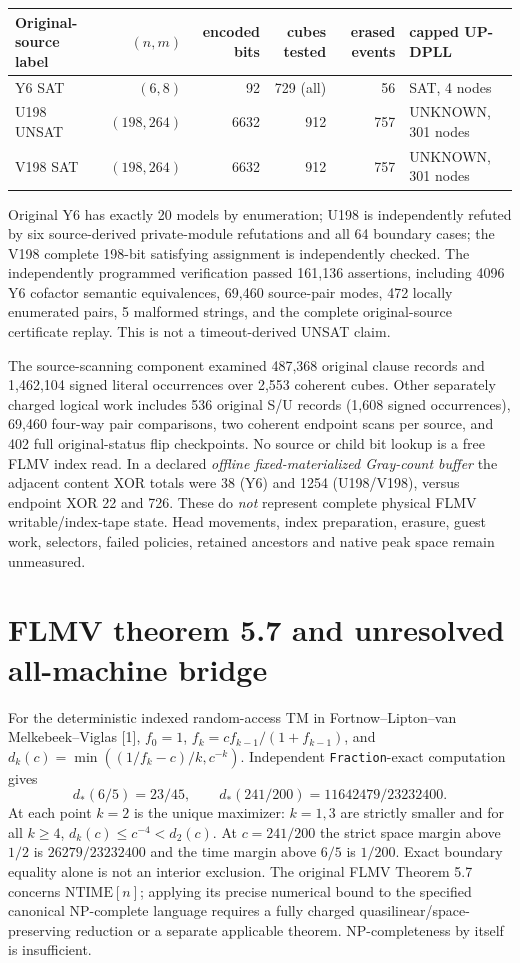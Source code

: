 \documentclass[10pt]{article}
\begin{document}
\begin{center}
\begin{tabular}{lrrrrl}
\toprule
Original-source label & $(n,m)$ & encoded bits & cubes tested & erased events & capped UP-DPLL \\
\midrule
Y6 SAT & $(6,8)$ & 92 & 729 (all) & 56 & SAT, 4 nodes\\
U198 UNSAT & $(198,264)$ & 6632 & 912 & 757 & UNKNOWN, 301 nodes\\
V198 SAT & $(198,264)$ & 6632 & 912 & 757 & UNKNOWN, 301 nodes\\
\bottomrule
\end{tabular}
\end{center}
Original Y6 has exactly 20 models by enumeration; U198 is independently refuted by six source-derived private-module refutations and all 64 boundary cases; the V198 complete 198-bit satisfying assignment is independently checked. The independently programmed verification passed 161,136 assertions, including 4096 Y6 cofactor semantic equivalences, 69,460 source-pair modes, 472 locally enumerated pairs, 5 malformed strings, and the complete original-source certificate replay. This is not a timeout-derived UNSAT claim.

The source-scanning component examined 487,368 original clause records and 1,462,104 signed literal occurrences over 2,553 coherent cubes. Other separately charged logical work includes 536 original S/U records (1,608 signed occurrences), 69,460 four-way pair comparisons, two coherent endpoint scans per source, and 402 full original-status flip checkpoints. No source or child bit lookup is a free FLMV index read. In a declared \emph{offline fixed-materialized Gray-count buffer} the adjacent content XOR totals were 38 (Y6) and 1254 (U198/V198), versus endpoint XOR 22 and 726. These do \emph{not} represent complete physical FLMV writable/index-tape state. Head movements, index preparation, erasure, guest work, selectors, failed policies, retained ancestors and native peak space remain unmeasured.

\section{FLMV theorem 5.7 and unresolved all-machine bridge}
For the deterministic indexed random-access TM in Fortnow--Lipton--van Melkebeek--Viglas [1], $f_0=1$, $f_k=cf_{k-1}/(1+f_{k-1})$, and $d_k(c)=\min((1/f_k-c)/k,c^{-k})$. Independent \texttt{Fraction}-exact computation gives
\begin{equation}
\boxed{d_*(6/5)=23/45},\qquad
\boxed{d_*(241/200)=11642479/23232400}.
\end{equation}
At each point $k=2$ is the unique maximizer: $k=1,3$ are strictly smaller and for all $k\ge4$, $d_k(c)\le c^{-4}<d_2(c)$. At $c=241/200$ the strict space margin above $1/2$ is $26279/23232400$ and the time margin above $6/5$ is $1/200$. Exact boundary equality alone is not an interior exclusion. The original FLMV Theorem 5.7 concerns $\mathrm{NTIME}[n]$; applying its precise numerical bound to the specified canonical NP-complete language requires a fully charged quasilinear/space-preserving reduction or a separate applicable theorem. NP-completeness by itself is insufficient.
\end{document}
